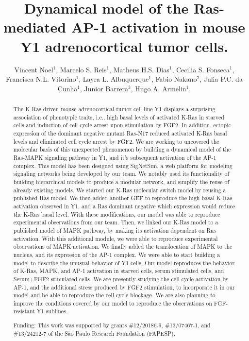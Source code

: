 \documentclass[twoside]{article}
\title{\vspace{-15mm}\fontsize{24pt}{10pt}\selectfont\textbf{ Dynamical model of the Ras-mediated AP-1 activation in mouse Y1 adrenocortical tumor cells. }} %
\author{ Vincent Noel$^{1}$, Marcelo S. Reis$^{1}$, Matheus H.S. Dias$^{1}$, Cecilia S. Fonseca$^{1}$, Francisca N.L. Vitorino$^{1}$, Layra L. Albuquerque$^{1}$, Fabio Nakano$^{2}$, Julia P.C. da Cunha$^{1}$, Junior Barrera$^{3}$, Hugo A. Armelin$^{1}$, }
\affil{ 1 Instituto Butantan

2 Escola de Artes, Ciências e Humanidades, Universidade de São Paulo, Brasil

3 Instituto de Matemática e Estatística, Universidade de São Paulo

 }
\date{}
\begin{document}
  
  
  \maketitle %
  
  
  \thispagestyle{fancy} %
  
  
  \begin{abstract}
  The K-Ras-driven mouse adrenocortical tumor cell line Y1 displays a surprising association of phenotypic traits, i.e., high basal levels of activated K-Ras in starved cells and induction of cell cycle arrest upon stimulation by FGF2. In addition, ectopic expression of the dominant negative mutant Ras-N17 reduced activated K-Ras basal levels and eliminated cell cycle arrest by FGF2. We are working to uncovered the molecular basis of this unexpected phenomenon by building a dynamical model of the Ras-MAPK signaling pathway in Y1, and it’s subsequent activation of the AP-1 complex. This model has been designed using SigNetSim, a web platform for modeling signaling networks being developed by our team. We notably used its functionality of building hierarchical models to produce a modular network, and simplify the reuse of already existing models. We started our K-Ras molecular switch model by reusing a published Ras model. We then added another GEF to reproduce the high basal K-Ras activation observed in Y1, and a Ras dominant negative which expression would reduce the K-Ras basal level. With these modifications, our model was able to reproduce experimental observations from our team. Then, we linked our K-Ras model to a published model of MAPK pathway, by making its activation dependent on Ras activation. With this additional module, we were able to reproduce experimental observations of MAPK activation. We finally added the translocation of MAPK to the nucleus, and its expression of the AP-1 complex. We were able to start building a model to describe the unusual behavior of Y1 cells. Our model reproduces the behavior of K-Ras, MAPK, and AP-1 activation in starved cells, serum stimulated cells, and Serum+FGF2 stimulated cells. We are presently studying the cell cycle activation by AP-1, and the additional stress produced by FGF2 stimulation, to incorporate it in our model and be able to reproduce the cell cycle blockage. We are also planning to improve  the conditions covered by our model to reproduce the observations on FGF-resistant Y1 sublines.
  
  Funding: This work was supported by grants \#12/20186-9, \#13/07467-1, and \#13/24212-7 of the S\~ao Paulo Research Foundation (FAPESP). \\ 
  \end{abstract}
  
\end{document}
